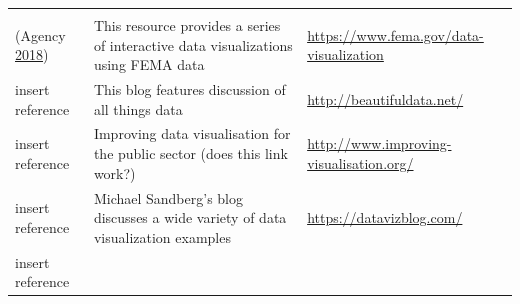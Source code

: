 \documentclass[]{book}
\begin{document}
\begin{longtable}[]{@{}lll@{}}
\begin{minipage}[t]{0.48\columnwidth}
\end{minipage}\tabularnewline
\begin{minipage}[t]{0.15\columnwidth}\raggedright
(Agency \protect\hyperlink{ref-fema_viz}{2018})\strut
\end{minipage} & \begin{minipage}[t]{0.28\columnwidth}\raggedright
This resource provides a series of interactive data visualizations using FEMA data\strut
\end{minipage} & \begin{minipage}[t]{0.48\columnwidth}\raggedright
\url{https://www.fema.gov/data-visualization}\strut
\end{minipage}\tabularnewline
\begin{minipage}[t]{0.15\columnwidth}\raggedright
insert reference\strut
\end{minipage} & \begin{minipage}[t]{0.28\columnwidth}\raggedright
This blog features discussion of all things data\strut
\end{minipage} & \begin{minipage}[t]{0.48\columnwidth}\raggedright
\url{http://beautifuldata.net/}\strut
\end{minipage}\tabularnewline
\begin{minipage}[t]{0.15\columnwidth}\raggedright
insert reference\strut
\end{minipage} & \begin{minipage}[t]{0.28\columnwidth}\raggedright
Improving data visualisation for the public sector (does this link work?)\strut
\end{minipage} & \begin{minipage}[t]{0.48\columnwidth}\raggedright
\url{http://www.improving-visualisation.org/}\strut
\end{minipage}\tabularnewline
\begin{minipage}[t]{0.15\columnwidth}\raggedright
insert reference\strut
\end{minipage} & \begin{minipage}[t]{0.28\columnwidth}\raggedright
Michael Sandberg's blog discusses a wide variety of data visualization examples\strut
\end{minipage} & \begin{minipage}[t]{0.48\columnwidth}\raggedright
\url{https://datavizblog.com/}\strut
\end{minipage}\tabularnewline
\begin{minipage}[t]{0.15\columnwidth}\raggedright
insert reference\strut

\end{minipage}
\end{longtable}
\end{document}
